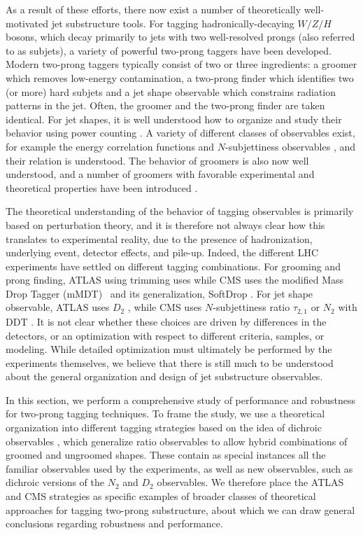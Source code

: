 \documentclass[11pt]{cernrep}
\begin{document}
As a result of these efforts, there now exist a number of theoretically well-motivated jet substructure tools.
%
For tagging hadronically-decaying $W/Z/H$ bosons, which decay primarily to jets with two well-resolved prongs (also referred to as subjets), a variety of powerful two-prong taggers have been developed.
%
Modern two-prong taggers typically consist of two or three
ingredients: a groomer which removes low-energy contamination, a
two-prong finder which identifies two (or more) hard subjets and a jet
shape observable which constrains radiation patterns in the
jet.
%
Often, the groomer and the two-prong finder are taken identical.
%
For jet shapes, it is well understood how to organize and study their
behavior using power counting \cite{Larkoski:2014gra}.
%
A variety of
different classes of observables exist, for example the energy
correlation functions \cite{Larkoski:2013eya,Moult:2016cvt,Komiske:2017aww} and $N$-subjettiness
observables \cite{Thaler:2010tr,Thaler:2011gf}, and their relation is
understood.
%
The behavior of groomers is also now well understood, and
a number of groomers with favorable experimental and theoretical properties have been introduced
\cite{Dasgupta:2013ihk,Larkoski:2014wba}.

The
theoretical understanding of the behavior of tagging observables is primarily based on perturbation theory, and it is therefore
not always clear how this translates to experimental reality, due to
the presence of hadronization, underlying event, detector effects, and
pile-up.
%
Indeed, the different LHC experiments have settled on different
tagging combinations.
%
For grooming and prong finding, ATLAS using trimming \cite{Krohn:2009th} uses while CMS uses the modified
  Mass Drop Tagger (mMDT)~\cite{Butterworth:2008iy,Dasgupta:2013ihk} and its generalization, SoftDrop \cite{Larkoski:2014wba}.
  For jet shape observable, ATLAS uses $D_2$ \cite{Larkoski:2014gra,Larkoski:2015kga}, while CMS uses $N$-subjettiness ratio $\tau_{2,1}$ \cite{Thaler:2010tr,Thaler:2011gf} or $N_2$ \cite{Moult:2016cvt} with DDT \cite{Dolen:2016kst}.
  It is not clear whether these choices are driven by differences in the detectors, or an optimization with respect to different criteria, samples, or modeling. While detailed optimization must ultimately be performed by the experiments themselves, we believe that there is still much to be understood about the general organization and design of jet substructure observables.

In this section, we perform a comprehensive study of performance and robustness for two-prong tagging techniques.
%
To frame the study, we use a theoretical organization into different tagging strategies based on the idea of dichroic observables \cite{Salam:2016yht}, which generalize ratio observables to allow hybrid combinations of groomed and ungroomed shapes.
 These contain as special instances all the familiar observables used by the experiments, as well as new observables, such as dichroic versions of the $N_2$ and $D_2$ observables.
 We therefore place the ATLAS and CMS strategies as specific examples of broader classes of theoretical approaches for tagging two-prong substructure, about which we can draw general conclusions regarding robustness and performance.
\end{document}
